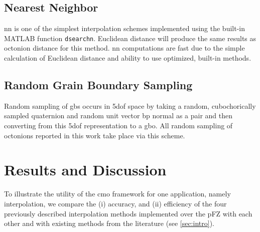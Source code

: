 \documentclass[preprint,12pt]{elsarticle}
\begin{document}
\subsection{Nearest Neighbor} \label{sec:methods:nn}

\Gls{nn} is one of the simplest interpolation schemes implemented using the built-in MATLAB function \texttt{dsearchn}. Euclidean distance will produce the same results as octonion distance for this method. \Gls{nn} computations are fast due to the simple calculation of Euclidean distance and ability to use optimized, built-in methods.

\subsection{Random Grain Boundary Sampling} \label{sec:methods:rand}

Random sampling of \glspl{gb} occurs in \gls{5dof} space by taking a random, cubochorically sampled quaternion and random unit vector \gls{bp} normal as a pair and then converting from this \gls{5dof} representation to a \gls{gbo}. All random sampling of octonions reported in this work take place via this scheme.

    
        
    

\section{Results and Discussion} \label{sec:results}

To illustrate the utility of the \gls{cmo} framework for one application, namely interpolation, we compare the (i) accuracy, and (ii) efficiency of the four previously described interpolation methods implemented over the pFZ with each other and with existing methods from the literature (see \cref{sec:intro}).
\end{document}
